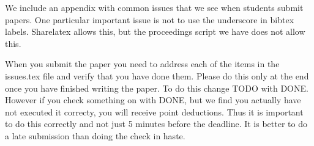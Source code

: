 \documentclass[sigconf]{acmart}
\begin{document}

 





\appendix

We include an appendix with common issues that we see when students submit papers. One particular important issue is not to use the underscore in bibtex labels. Sharelatex allows this, but the proceedings script we have does not allow this.

When you submit the paper you need to address each of the items in the issues.tex file and verify that you have done them. Please do this only at the end once you have finished writing the paper. To do this change TODO with DONE. However if you check something on with DONE, but we find you actually have not executed it correcty, you will receive point deductions. Thus it is important to do this correctly and not just 5 minutes before the deadline. It is better to do a late
submission than doing the check in haste. 


\end{document}
